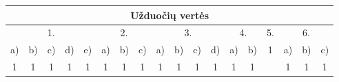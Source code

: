 \documentclass[a4paper]{article}
\begin{document}
\begin{table}[!htpb]
      \centering
      \begin{tabular}{|cccccccccccccccccc|}
            \hline
            \multicolumn{18}{|c|}{Užduočių vertės}

            \\ \hline
            \multicolumn{5}{|c|}{1.}
                                                    &
            \multicolumn{3}{c|}{2.}                 &
            \multicolumn{4}{c|}{3.}
                                                    & \multicolumn{2}{c|}{4.} &
            \multicolumn{1}{c|}{5.}                 & \multicolumn{3}{c|}{6.}
            \\ \hline
            \multicolumn{1}{|c|}{a)}                & \multicolumn{1}{c|}{b)} &
            \multicolumn{1}{c|}{c)}                 & \multicolumn{1}{c|}{d)} & \multicolumn{1}{c|}{e)} &
            \multicolumn{1}{c|}{a)}                 & \multicolumn{1}{c|}{b)} & \multicolumn{1}{c|}{c)} &
            \multicolumn{1}{c|}{a)}                 & \multicolumn{1}{c|}{b)} & \multicolumn{1}{c|}{c)} &
            \multicolumn{1}{c|}{d)}                 & \multicolumn{1}{c|}{a)} & \multicolumn{1}{c|}{b)} &
            \multicolumn{1}{c|}{\multirow{2}{*}{1}} & \multicolumn{1}{c|}{a)} &
            \multicolumn{1}{c|}{b)}                 & c)                                                  \\
            \multicolumn{1}{|c|}{1}                 & \multicolumn{1}{c|}{1}  &
            \multicolumn{1}{c|}{1}                  & \multicolumn{1}{c|}{1}  & \multicolumn{1}{c|}{1}  &
            \multicolumn{1}{c|}{1}                  & \multicolumn{1}{c|}{1}  & \multicolumn{1}{c|}{1}  &
            \multicolumn{1}{c|}{1}                  & \multicolumn{1}{c|}{1}  & \multicolumn{1}{c|}{1}  &
            \multicolumn{1}{c|}{1}                  & \multicolumn{1}{c|}{1}  & \multicolumn{1}{c|}{1}  &
            \multicolumn{1}{c|}{}                   & \multicolumn{1}{c|}{1}  &
            \multicolumn{1}{c|}{1}                  & 1                                                   \\ \hline
      \end{tabular}
\end{table}
\end{document}
